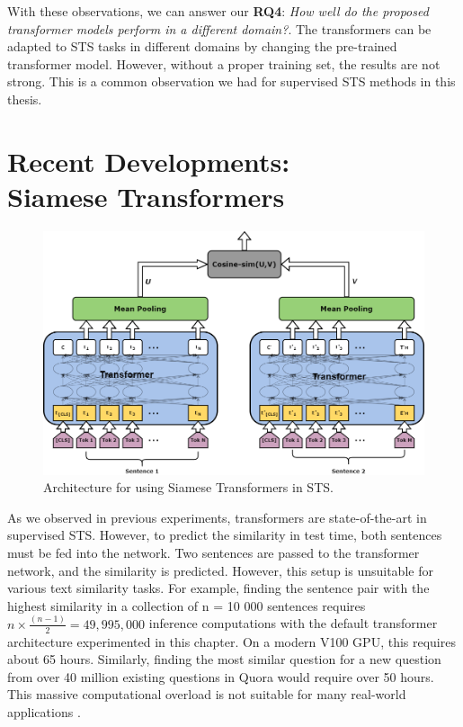 With these observations, we can answer our \textbf{RQ4}: \textit{How well do the proposed transformer models perform in a different domain?}. The transformers can be adapted to STS tasks in different domains by changing the pre-trained transformer model. However, without a proper training set, the results are not strong. This is a common observation we had for supervised STS methods in this thesis.



\section{Recent Developments: \\ Siamese Transformers}
\label{sec:transformer_siamese}

\begin{figure}[ht]
	\centering
	\includegraphics[scale=0.35]{figures/semantic_textual_similarity/transformers/sentence-bert.png}
	\caption[Architecture for using Siamese Transformers in STS]{Architecture for using Siamese Transformers in STS.}
	\label{fig:siamese_transformers}
\end{figure}

As we observed in previous experiments, transformers are state-of-the-art in supervised STS. However, to predict the similarity in test time, both sentences must be fed into the network. Two sentences are passed to the transformer network, and the similarity is predicted. However, this setup is unsuitable for various text similarity tasks. For example, finding the sentence pair with the highest similarity in a collection of n = 10 000 sentences requires $n \times \frac {(n-1)}{2} = 49,995,000$ inference computations with the default transformer architecture experimented in this chapter. On a modern V100 GPU, this requires about 65 hours. Similarly, finding the most similar question for a new question from over 40 million existing questions in Quora would require over 50 hours. This massive computational overload is not suitable for many real-world applications \autocite{reimers-gurevych-2019-sentence}.

